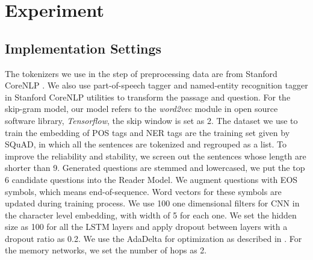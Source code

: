 \documentclass[sigconf]{acmart}
\begin{document}
\section{Experiment} 
\subsection{Implementation Settings}
The tokenizers we use in the step of preprocessing data are from Stanford CoreNLP \cite{manningstanford}. We also use part-of-speech tagger and named-entity recognition tagger in Stanford CoreNLP utilities to transform the passage and question. For the skip-gram model, our model refers to the \emph{word2vec} module in open source software library, \emph{Tensorflow}, the skip window is set as 2. The dataset we use to train the embedding of POS tags and NER tags are the training set given by SQuAD, in which all the sentences are tokenized and regrouped as a list. To improve the reliability and stability, we screen out the sentences whose length are shorter than 9. Generated questions are stemmed and lowercased, we put the top 6 candidate questions into the Reader Model. We augment questions with EOS symbols, which means end-of-sequence. Word vectors for these symbols are updated during training process. We use 100 one dimensional filters for CNN in the character level embedding, with width of 5 for each one. We set the hidden size as 100 for all the LSTM layers and apply dropout\cite{srivastava2014dropout} between layers with a dropout ratio as 0.2. We use the AdaDelta for optimization as described in \cite{zeiler2012adadelta}. For the memory networks, we set the number of hops as 2. 

\end{document}
